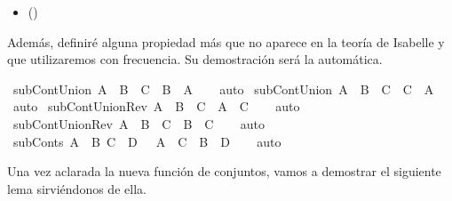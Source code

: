 \begin{isabellebody}
\begin{isamarkuptext}
 \begin{itemize}
  \item[]  \hfill ()
  \end{itemize}
Además, definiré alguna propiedad más que no aparece en la teoría de Isabelle y que utilizaremos
con frecuencia. Su demostración será la automática.%
\end{isamarkuptext}\isamarkuptrue%
\isamarkupfalse%
\ subContUnion{}{\isacharcolon}\ {\isachardoublequoteopen}A\ {\isacharequal}\ B\ {\isasymunion}\ C\ {\isasymLongrightarrow}\ B\ {\isasymsubseteq}\ A{\isachardoublequoteclose}\isanewline
%
\isadelimproof
\ \ %
\endisadelimproof
%
\isatagproof
{}\isamarkupfalse%
\ auto%
\endisatagproof
{\isafoldproof}%
%
\isadelimproof
\isanewline
%
\endisadelimproof
\isanewline
{}\isamarkupfalse%
\ subContUnion{}{\isacharcolon}\ {\isachardoublequoteopen}A\ {\isacharequal}\ B\ {\isasymunion}\ C\ {\isasymLongrightarrow}\ C\ {\isasymsubseteq}\ A{\isachardoublequoteclose}\isanewline
%
\isadelimproof
\ \ %
\endisadelimproof
%
\isatagproof
{}\isamarkupfalse%
\ auto%
\endisatagproof
{\isafoldproof}%
%
\isadelimproof
\isanewline
%
\endisadelimproof
\isanewline
{}\isamarkupfalse%
\ subContUnionRev{}{\isacharcolon}\ {\isachardoublequoteopen}A\ {\isasymunion}\ B\ {\isasymsubseteq}\ C\ {\isasymLongrightarrow}\ A\ {\isasymsubseteq}\ C{\isachardoublequoteclose}\isanewline
%
\isadelimproof
\ \ %
\endisadelimproof
%
\isatagproof
{}\isamarkupfalse%
\ auto%
\endisatagproof
{\isafoldproof}%
%
\isadelimproof
\isanewline
%
\endisadelimproof
\isanewline
{}\isamarkupfalse%
\ subContUnionRev{}{\isacharcolon}\ {\isachardoublequoteopen}A\ {\isasymunion}\ B\ {\isasymsubseteq}\ C\ {\isasymLongrightarrow}\ B\ {\isasymsubseteq}\ C{\isachardoublequoteclose}\isanewline
%
\isadelimproof
\ \ %
\endisadelimproof
%
\isatagproof
{}\isamarkupfalse%
\ auto%
\endisatagproof
{\isafoldproof}%
%
\isadelimproof
\isanewline
%
\endisadelimproof
\isanewline
{}\isamarkupfalse%
\ subConts{\isacharcolon}\ {\isachardoublequoteopen}{\isasymlbrakk}A\ {\isasymsubseteq}\ B{\isacharsemicolon}\ C\ {\isasymsubseteq}\ D{\isasymrbrakk}\ {\isasymLongrightarrow}\ \ A\ {\isasymunion}\ C\ {\isasymsubseteq}\ B\ {\isasymunion}\ D{\isachardoublequoteclose}\isanewline
%
\isadelimproof
\ \ %
\endisadelimproof
%
\isatagproof
{}\isamarkupfalse%
\ auto%
\endisatagproof
{\isafoldproof}%
%
\isadelimproof
%
\endisadelimproof
%
\begin{isamarkuptext}%
Una vez aclarada la nueva función de conjuntos, vamos a demostrar el siguiente lema sirviéndonos 
de ella.


\end{isamarkuptext}
\end{isabellebody}
